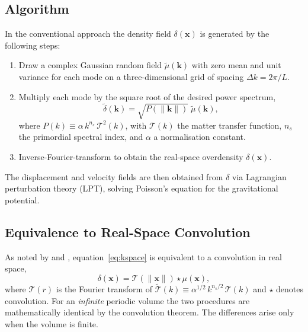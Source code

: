 \documentclass[12pt]{article}
\begin{document}
\subsection{Algorithm}

In the conventional approach the density field $\delta(\mathbf{x})$ is
generated by the following steps:
%
\begin{enumerate}
  \item Draw a complex Gaussian random field $\tilde{\mu}(\mathbf{k})$
        with zero mean and unit variance for each mode on a
        three-dimensional grid of spacing $\Delta k = 2\pi/L$.
  \item Multiply each mode by the square root of the desired power
        spectrum,
        \begin{equation}
          \tilde{\delta}(\mathbf{k}) = \sqrt{P(\|\mathbf{k}\|)}\;
          \tilde{\mu}(\mathbf{k}),
          \label{eq:kspace}
        \end{equation}
        where $P(k) \equiv \alpha\,k^{n_s}\,\mathcal{T}^2(k)$, with
        $\mathcal{T}(k)$ the matter transfer function, $n_s$ the
        primordial spectral index, and $\alpha$ a normalisation constant.
  \item Inverse-Fourier-transform to obtain the real-space overdensity
        $\delta(\mathbf{x})$.
\end{enumerate}
%
The displacement and velocity fields are then obtained from $\delta$ via
Lagrangian perturbation theory (LPT), solving Poisson's equation for the
gravitational potential.

\subsection{Equivalence to Real-Space Convolution}

As noted by \citet{Pen1997} and \citet{Hahn2011}, equation~\eqref{eq:kspace}
is equivalent to a convolution in real space,
\begin{equation}
  \delta(\mathbf{x}) = \mathcal{T}(\|\mathbf{x}\|) \star \mu(\mathbf{x}),
  \label{eq:realconv}
\end{equation}
where $\mathcal{T}(r)$ is the Fourier transform of
$\tilde{\mathcal{T}}(k) \equiv \alpha^{1/2}\,k^{n_s/2}\,\mathcal{T}(k)$
and $\star$ denotes convolution. For an \emph{infinite} periodic volume
the two procedures are mathematically identical by the convolution
theorem. The differences arise only when the volume is finite.

\end{document}
